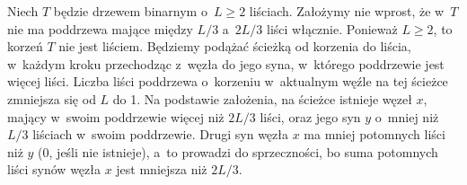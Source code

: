 \exercise %

\noindent Niech $T$ będzie drzewem binarnym o~$L\ge2$ liściach.
Założymy nie wprost, że w~$T$ nie ma poddrzewa mające między $L/3$ a~$2L/3$ liści włącznie.
Ponieważ $L\ge2$, to korzeń $T$ nie jest liściem.
Będziemy podążać ścieżką od korzenia do liścia, w~każdym kroku przechodząc z~węzła do jego syna, w~którego poddrzewie jest więcej liści.
Liczba liści poddrzewa o~korzeniu w~aktualnym węźle na tej ścieżce zmniejsza się od $L$ do 1.
Na podstawie założenia, na ścieżce istnieje węzeł $x$, mający w~swoim poddrzewie więcej niż $2L/3$ liści, oraz jego syn $y$ o~mniej niż $L/3$ liściach w~swoim poddrzewie.
Drugi syn węzła $x$ ma mniej potomnych liści niż $y$ (0, jeśli nie istnieje), a~to prowadzi do sprzeczności, bo suma potomnych liści synów węzła $x$ jest mniejsza niż $2L/3$.

